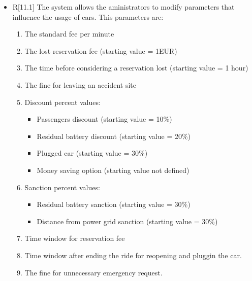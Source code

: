 \begin{itemize}
	\begin{itemize}
		\item R[11.1] The system allows the aministrators to modify parameters that influence the usage of cars. This parameters are:
			\begin{enumerate}
				\item The standard fee per minute
				\item The lost reservation fee (starting value = 1EUR)
				\item The time before considering a reservation lost (starting value = 1 hour)
				\item The fine for leaving an accident site
				\item Discount percent   values:
					\begin{itemize}
						\item Passengers discount (starting value = 10\%)
						\item Residual battery discount (starting value = 20\%)
						\item Plugged car (starting value = 30\%)
						\item Money saving option (starting value not defined)
					\end{itemize}
				\item Sanction percent values:
					\begin{itemize}
						\item Residual battery sanction (starting value = 30\%)
						\item Distance from power grid sanction (starting value = 30\%)
					\end{itemize}
				\item Time window for reservation fee
				\item Time window after ending the ride for reopening and pluggin the car.
				\item The fine for unnecessary emergency request.
			\end{enumerate}
	\end{itemize}
\end{itemize}

